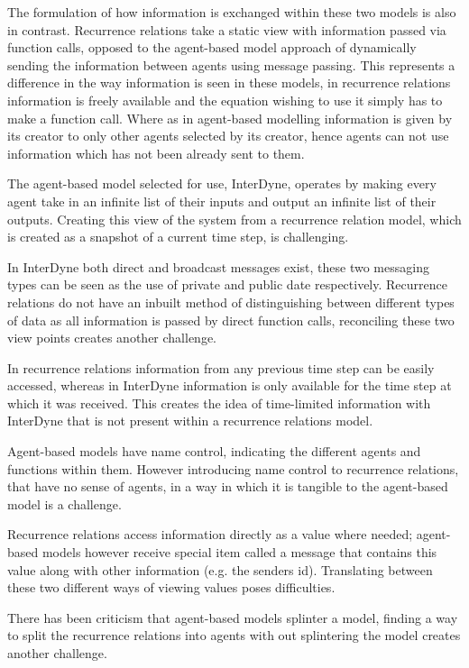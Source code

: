 \documentclass{article}
\begin{document}
The formulation of how information is exchanged within these two models is also in contrast. Recurrence relations take a static view with information passed via function calls, opposed to the agent-based model approach of dynamically sending the information between agents using message passing. This represents a difference in the way information is seen in these models, in recurrence relations information is freely available and the equation wishing to use it simply has to make a function call. Where as in agent-based modelling information is given by its creator to only other agents selected by its creator, hence agents can not use information which has not been already sent to them.

The agent-based model selected for use, InterDyne, operates by making every agent take in an infinite list of their inputs and output an infinite list of their outputs. Creating this view of the system from a recurrence relation model, which is created as a snapshot of a current time step, is challenging. 

In InterDyne both direct and broadcast messages exist, these two messaging types can be seen as the use of private and public date respectively. Recurrence relations do not have an inbuilt method of distinguishing between different types of data as all information is passed by direct function calls, reconciling these two view points creates another challenge. 

In recurrence relations information from any previous time step can be easily accessed, whereas in InterDyne information is only available for the time step at which it was received. This creates the idea of time-limited information with InterDyne that is not present within a recurrence relations model.   

Agent-based models have name control, indicating the different agents and functions within them. However introducing name control to  recurrence relations, that have no sense of agents, in a way in which it is tangible to the agent-based model is a challenge. 

Recurrence relations access information directly as a value where needed; agent-based models however receive special item called a message that contains this value along with other information (e.g. the senders id). Translating between these two different ways of viewing values poses difficulties.  

There has been criticism that agent-based models splinter a model, finding a way to split the recurrence relations into agents with out splintering the model creates another challenge. 
\end{document}
